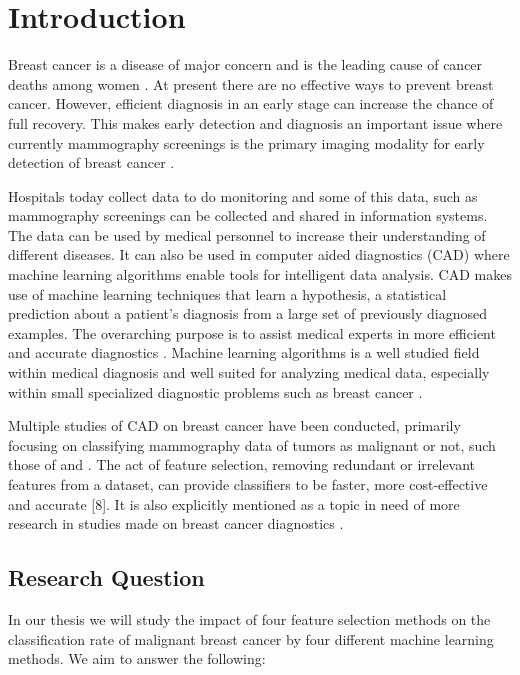 \chapter{Introduction}

Breast cancer is a disease of major concern and is the leading cause of cancer deaths among women \parencite{althuis2005}. At present there are no effective ways to prevent breast cancer. However, efficient diagnosis in an early stage can increase the chance of full recovery. This makes early detection and diagnosis an important issue where currently mammography screenings is the primary imaging modality for early detection of breast cancer \parencite{tabar2001}.

Hospitals today collect data to do monitoring and some of this data, such as mammography screenings can be collected and shared in information systems. The data can be used by medical personnel to increase their understanding of different diseases. It can also be used in computer aided diagnostics (CAD) where machine learning algorithms enable tools for intelligent data analysis. CAD makes use of machine learning techniques that learn a hypothesis, a statistical prediction about a patient's diagnosis from a large set of previously diagnosed examples.  The overarching purpose is to assist medical experts in more efficient and accurate diagnostics \parencite{li2007}. Machine learning algorithms is a well studied field within medical diagnosis and well suited for analyzing medical data, especially within small specialized diagnostic problems such as breast cancer \parencite{kononenko2001}.

Multiple studies of CAD on breast cancer have been conducted, primarily focusing on classifying mammography data of tumors as malignant or not, such those of \textcite{ramos2012} and \textcite{akay2009}. The act of feature selection, removing redundant or irrelevant features from a dataset, can provide classifiers to be faster, more cost-effective and accurate [8]. It is also explicitly mentioned as a topic in need of more research in studies made on breast cancer diagnostics \parencite{akin2011}.


\section{Research Question}

In our thesis we will study the impact of four feature selection methods on the classification rate of malignant breast cancer by four different machine learning methods. We aim to answer the following:

